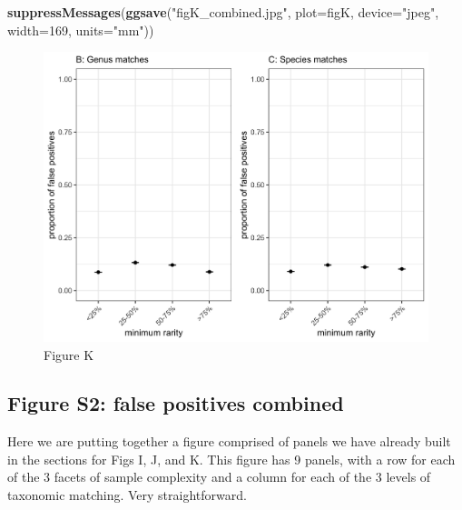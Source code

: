 \documentclass[
]{article}
\newenvironment{Shaded}{\begin{snugshade}}{\end{snugshade}}
\newcommand{\DataTypeTok}[1]{\textcolor[rgb]{0.13,0.29,0.53}{#1}}
\newcommand{\DecValTok}[1]{\textcolor[rgb]{0.00,0.00,0.81}{#1}}
\newcommand{\KeywordTok}[1]{\textcolor[rgb]{0.13,0.29,0.53}{\textbf{#1}}}
\newcommand{\NormalTok}[1]{#1}
\newcommand{\StringTok}[1]{\textcolor[rgb]{0.31,0.60,0.02}{#1}}
\begin{document}
\begin{Shaded}
\begin{Highlighting}[]
\KeywordTok{suppressMessages}\NormalTok{(}\KeywordTok{ggsave}\NormalTok{(}\StringTok{"figK_combined.jpg"}\NormalTok{, }\DataTypeTok{plot=}\NormalTok{figK, }\DataTypeTok{device=}\StringTok{"jpeg"}\NormalTok{, }\DataTypeTok{width=}\DecValTok{169}\NormalTok{, }\DataTypeTok{units=}\StringTok{"mm"}\NormalTok{))}
\end{Highlighting}
\end{Shaded}

\begin{figure}
\centering
\includegraphics{figK_combined.jpg}
\caption{Figure K}
\end{figure}

\hypertarget{figure-s2-false-positives-combined}{%
\subsection{Figure S2: false positives
combined}\label{figure-s2-false-positives-combined}}

Here we are putting together a figure comprised of panels we have
already built in the sections for Figs I, J, and K. This figure has 9
panels, with a row for each of the 3 facets of sample complexity and a
column for each of the 3 levels of taxonomic matching. Very
straightforward.
\end{document}
